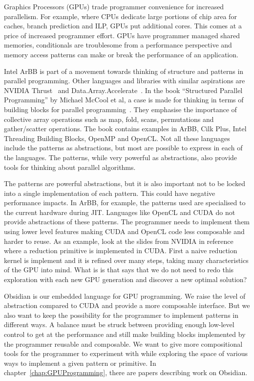 \documentclass[a4paper]{book}
\begin{document}
Graphics Processors (GPUs) trade programmer convenience for increased parallelism. 
For example, where CPUs dedicate large portions of chip area for caches, branch prediction and 
ILP, GPUs put additional cores. This comes at a price of increased programmer effort.
GPUs have programmer managed shared memories, conditionals are troublesome from a performance 
perspective and memory access patterns can make or break the performance of an 
application.  

Intel ArBB is part of a movement towards thinking of structure and patterns in 
parallel programming. Other languages and libraries with similar aspirations 
are NVIDIA Thrust~\citet{THRUST} and Data.Array.Accelerate~\citet{ACCELERATEDAMP11}.
In the book ``Structured Parallel Programming'' by Michael McCool et al, a case is 
made for thinking in terms of building blocks for parallel programming~\citet{STRUCTURED}. 
They emphasise the importance of collective array operations such as map, fold, scans, 
permutations and gather/scatter operations. The book contains examples in ArBB, Cilk Plus, 
Intel Threading Building Blocks, OpenMP and OpenCL. Not all these languages include 
the patterns as abstractions, but most are possible to express in each of the languages. 
The patterns, while very powerful as abstractions, also provide tools for thinking about 
parallel algorithms. 

The patterns are powerful abstractions, but it is also important not to be locked into 
a single implementation of each pattern. This could have negative performance impacts. 
In ArBB, for example, the patterns used are specialised to the current hardware during JIT. 
Languages like OpenCL and CUDA do not provide abstractions of these patterns. The programmer 
needs to implement them using lower level features making CUDA and OpenCL code less composable 
and harder to reuse. As an example, look at the slides from NVIDIA in reference~\citet{reduction} 
where a reduction primitive is implemented in CUDA. First a naive reduction kernel is implement 
and it is refined over many steps, taking many characteristics of the GPU into mind. What is 
is that says that we do not need to redo this exploration with each new GPU generation 
and discover a new optimal solution?  

Obsidian is our embedded language for GPU programming. We raise the level of abstraction 
compared to CUDA and provide a more composable interface. But we also want to keep 
the possibility for the programmer to implement patterns in different ways. A balance 
must be struck between providing enough low-level control to get at the performance 
and still make building blocks implemented by the programmer reusable and composable. 
We want to give more compositional tools for the programmer to experiment with while 
exploring the space of various ways to implement a given pattern or primitive. 
In chapter~\ref{chap:GPUProgramming}, there are papers describing work on Obsidian. 
\end{document}
